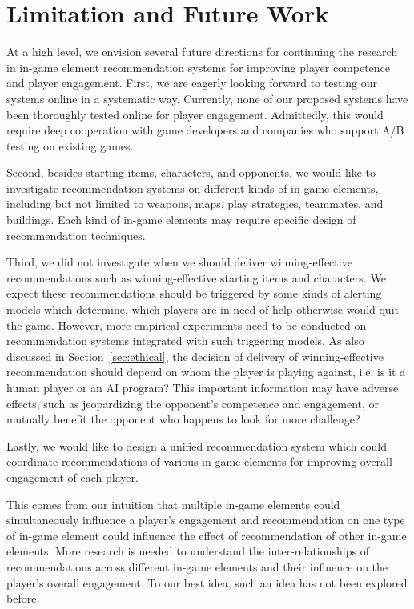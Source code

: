 \chapter{Limitation and Future Work} 

\label{chapter:future} 

At a high level, we envision several future directions for continuing the research in in-game element recommendation systems for improving player competence and player engagement. First, we are eagerly looking forward to testing our systems online in a systematic way. Currently, none of our proposed systems have been thoroughly tested online for player engagement. Admittedly, this would require deep cooperation with game developers and companies who support A/B testing on existing games. 

Second, besides starting items, characters, and opponents, we would like to investigate recommendation systems on different kinds of in-game elements, including but not limited to weapons, maps, play strategies, teammates, and buildings. Each kind of in-game elements may require specific design of recommendation techniques. 

Third, we did not investigate when we should deliver winning-effective recommendations such as winning-effective starting items and characters. We expect these recommendations should be triggered by some kinds of alerting models which determine, which players are in need of help otherwise would quit the game. However, more empirical experiments need to be conducted on recommendation systems integrated with such triggering models. As also discussed in Section~\ref{sec:ethical}, the decision of delivery of winning-effective recommendation should  depend on whom the player is playing against, i.e.  is it a human player or an AI program? This important information may have adverse effects, such as jeopardizing the opponent's competence and engagement, or mutually benefit the opponent who happens to look for more challenge?

Lastly, we would like to design a unified recommendation system which could coordinate  recommendations of various in-game elements for improving overall engagement of each player. 

This comes from our intuition that multiple in-game elements could simultaneously influence a player's engagement and recommendation on one type of in-game element could influence the effect of recommendation of other in-game elements. More research is needed to understand the inter-relationships of recommendations across different in-game elements and their influence on the player's overall engagement. To our best idea, such an idea has not been explored before.


